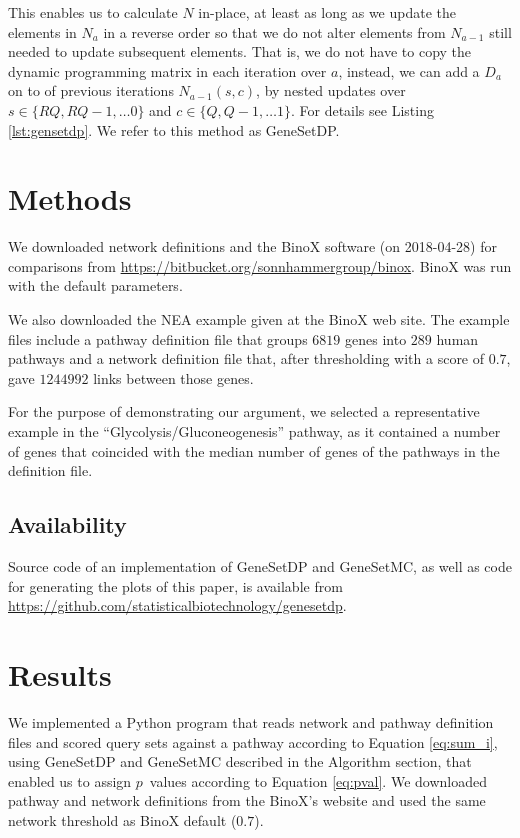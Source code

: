 \documentclass[a4paper,american]{lipics-v2016}
\begin{document}
This enables us to calculate $N$ in-place, at least as long as we update the elements in $N_a$ in a reverse order so that we do not alter elements from $N_{a-1}$ still needed to update subsequent elements. That is, we do not have to copy the dynamic programming matrix in each iteration over $a$, instead, we can add a $D_a$ on to of previous iterations $N_{a-1}(s,c)$, by nested updates over $s \in \{ RQ, RQ-1, \ldots 0 \}$ and $c \in \{ Q, Q-1, \ldots 1 \}$. For details see Listing \ref{lst:gensetdp}. We refer to this method as GeneSetDP.

\section*{Methods}

We downloaded network definitions and the BinoX software (on 2018-04-28) for comparisons from \url{https://bitbucket.org/sonnhammergroup/binox}. BinoX was run with the default parameters.

We also downloaded the NEA example given at the BinoX web site. The example files include a pathway definition file that groups $6819$ genes into $289$ human pathways and a network definition file that, after thresholding with a score of $0.7$, gave $1244992$ links between those genes.

For the purpose of demonstrating our argument, we selected a representative example in the ``Glycolysis/Gluconeogenesis'' pathway, as it contained a number of genes that coincided with the median number of genes of the pathways in the definition file.

\subsection*{Availability}

Source code of an implementation of GeneSetDP and GeneSetMC, as well as code for generating the plots of this paper, is available from \url{https://github.com/statisticalbiotechnology/genesetdp}.

\section*{Results}

We implemented a Python program that reads network and pathway definition files and scored query sets against a pathway according to Equation \ref{eq:sum_i}, using GeneSetDP and GeneSetMC described in the Algorithm section, that enabled us to assign $p$~values according to Equation \ref{eq:pval}. We downloaded pathway and network definitions from the BinoX's website and used the same network threshold as BinoX default ($0.7$).
\end{document}
